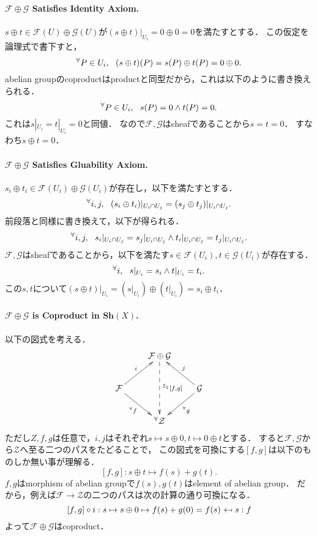 \documentclass[a4paper]{jsarticle}
\newcommand{\shF}{\mathcal{F}}
\newcommand{\shG}{\mathcal{G}}
\newcommand{\Sh}{\mathbf{Sh}}
\begin{document}
    \paragraph{$\shF \oplus \shG$ Satisfies Identity Axiom.}
    $s \oplus t \in \shF(U) \oplus \shG(U)$が$(s \oplus t)|_{U_i}=0 \oplus 0=0$を満たすとする．
    この仮定を論理式で書下すと，
    \[ {}^{\forall} P \in U_i,~~ (s \oplus t)(P)=s(P) \oplus t(P)=0 \oplus 0. \]
    abelian groupのcoproductはproductと同型だから，これは以下のように書き換えられる．
    \[ {}^{\forall} P \in U_i,~~ s(P)=0 \land t(P)=0. \]
    これは$s|_{U_i}=t|_{U_i}=0$と同値．
    なので$\shF,\shG$はsheafであることから$s=t=0$．
    すなわち$s \oplus t=0$．

    \paragraph{$\shF \oplus \shG$ Satisfies Gluability Axiom.}
    $s_i \oplus t_i \in \shF(U_i) \oplus \shG(U_i)$が存在し，以下を満たすとする．
    \[ {}^{\forall} i,j,~~ (s_i \oplus t_i)|_{U_i \cap U_j}=(s_j \oplus t_j)|_{U_i \cap U_j}. \]
    前段落と同様に書き換えて，以下が得られる．
    \[ {}^{\forall} i,j,~~ s_i|_{U_i \cap U_j}=s_j|_{U_i \cap U_j} \land t_i|_{U_i \cap U_j}=t_j|_{U_i \cap U_j}. \]
    $\shF,\shG$はsheafであることから，以下を満たす$s \in \shF(U_i),t \in \shG(U_i)$が存在する．
    \[ {}^{\forall} i,~~ s|_{U_i}=s_i \land t|_{U_i}=t_i. \]
    この$s,t$について$(s \oplus t)|_{U_i}=(s|_{U_i}) \oplus (t|_{U_i})=s_i \oplus t_i$．

    \paragraph{$\shF \oplus \shG$ is Coproduct in $\Sh(X)$.}
    以下の図式を考える．
    \[
    \xymatrix
    {
        {} & \shF \oplus \shG \ar@{-->}[dd]^-{{}^{\exists_1} [f,g]}& {} \\
        \shF \ar[rd]_-{{}^\forall f} \ar[ru]^-{i}& {} & \shG \ar[ld]^-{{}^\forall g} \ar[lu]_-{j}\\
        {} & {}^\forall \mathcal{Z} & {}
    }
    \]
    ただし$Z,f,g$は任意で，$i, j$はそれぞれ$s \mapsto s \oplus 0, t \mapsto 0 \oplus t$とする．
    すると$\shF, \shG$から$\mathcal{Z}$へ至る二つのパスをたどることで，
    この図式を可換にする$[f,g]$は以下のものしか無い事が理解る．
    \[ [f,g]: s \oplus t \mapsto f(s)+g(t). \]
    $f,g$はmorphism of abelian groupで$f(s),g(t)$はelement of abelian group．
    だから，例えば$\shF \to \mathcal{Z}$の二つのパスは次の計算の通り可換になる．
    \[ [f,g] \circ i : s \mapsto s \oplus 0 \mapsto f(s)+g(0)=f(s) ~\mapedfrom~ s: f \]
    よって$\shF \oplus \shG$はcoproduct．
\end{document}
